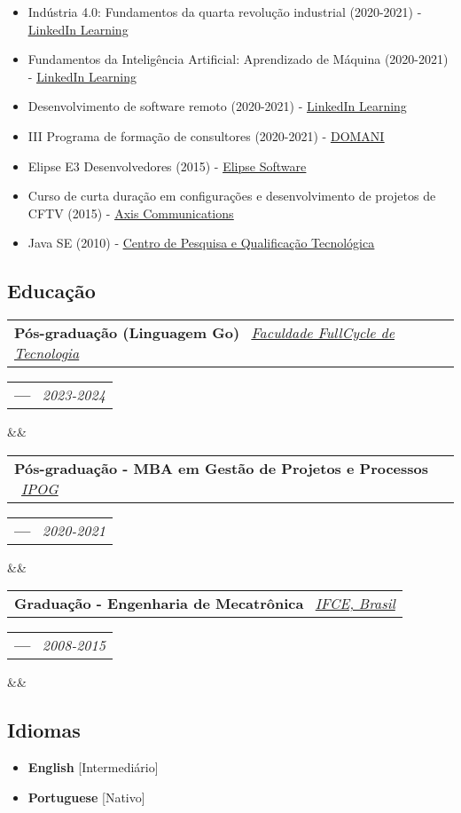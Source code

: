 \documentclass[11pt,a4paper,sans]{moderncv}
\makeatletter
\newcommand*{\customcventry}[7][.13em]{
\begin{tabular}{@{}l}
{\bfseries #4} \
{\itshape #3}
\end{tabular}
\hfill
\begin{tabular}{l@{}}
{\bfseries #5} \
{\itshape #2}
\end{tabular}
\ifx&#7&%
\else{\
\begin{minipage}{\maincolumnwidth}%
\small#7%
\end{minipage}}\fi%
\par\addvspace{#1}}
\makeatother
\begin{document}
\begin{samepage}
{\begin{itemize}[label=\textbullet]
		  \item Indústria 4.0: Fundamentos da quarta revolução industrial (2020-2021) - \underline{\color{blue}\href{https://linkedin.com/learning}{LinkedIn Learning}}
		  \item Fundamentos da Inteligência Artificial: Aprendizado de Máquina (2020-2021) - \underline{\color{blue}\href{https://linkedin.com/learning}{LinkedIn Learning}}
		  \item Desenvolvimento de software remoto (2020-2021) - \underline{\color{blue}\href{https://linkedin.com/learning}{LinkedIn Learning}}
		  \item III Programa de formação de consultores (2020-2021) - \underline{\color{blue}\href{https://domani.com.br}{DOMANI}}
		  \item Elipse E3 Desenvolvedores (2015) - \underline{\color{blue}\href{https://elipse.com}{Elipse Software}}
		  \item Curso de curta duração em configurações e desenvolvimento de projetos de CFTV (2015) - \underline{\color{blue}\href{https://axis.com}{Axis Communications}}
		  \item Java SE (2010) - \underline{\color{blue}\href{https://cpqt.com.br}{Centro de Pesquisa e Qualificação Tecnológica}}
	  \end{itemize}}
\end{samepage}
\vspace{\baselineskip}

\begin{samepage}
	\section{Educação}
	\customcventry{2023-2024}{{\color{blue}\href{https://fctech.edu.br}{Faculdade FullCycle de Tecnologia}}}{Pós-graduação (Linguagem Go)}{---}{}{}
	\customcventry{2020-2021}{{\color{blue}\href{https://www.ipog.edu.br}{IPOG}}}{Pós-graduação - MBA em Gestão de Projetos e Processos}{---}{}{}
	\customcventry{2008-2015}{{\color{blue}\href{https://ifce.edu.br}{IFCE, Brasil}}}{Graduação - Engenharia de Mecatrônica}{---}{}{}
\end{samepage}
\vspace{\baselineskip}

\begin{samepage}
	\section{Idiomas}
	\begin{multicols}{2}
		\begin{itemize}[label=\textbullet]
			\item \textbf{English} [Intermediário]
			\item \textbf{Portuguese} [Nativo]
		\end{itemize}
	\end{multicols}
\end{samepage}
\vspace{\baselineskip}
\end{document}
